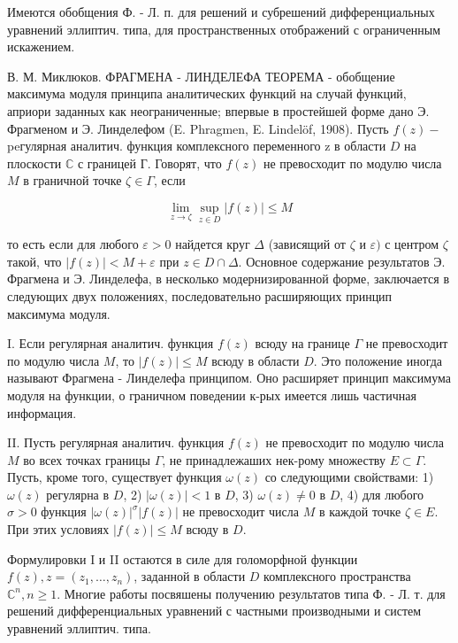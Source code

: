 \documentclass[10pt]{article}
\begin{document}
Имеются обобщения Ф. - Л. п. для решений и субрешений дифференциальных уравнений эллиптич. типа, для пространственных отображений с ограниченным искажением.



В. М. Миклюков. ФРАГМЕНА - ЛИНДЕЛЕФА ТЕОРЕМА - обобщение максимума модуля принципа аналитических функций на случай функций, априори заданных как неограниченные; впервые в простейшей форме дано Э. Фрагменом и Э. Линделефом (E. Phragmen, E. Lindelöf, 1908). Пусть $f(z)-$ peгулярная аналитич. функция комплексного переменного z в области $D$ на плоскости $\mathbb{C}$ с границей Г. Говорят, что $f(z)$ не превосходит по модулю числа $M$ в граничной точке $\zeta \in \Gamma$, если



\[

\lim _{z \rightarrow \zeta} \sup _{z \in D}|f(z)| \leqslant M

\]



то есть если для любого $\varepsilon>0$ найдется круг $\Delta$ (зависящий от $\zeta$ и $\varepsilon)$ с центром $\zeta$ такой, что $|f(z)|<M+\varepsilon$ при $z \in D \cap \Delta$. Основное содержание результатов Э. Фрагмена и Э. Линделефа, в несколько модернизированной форме, заключается в следующих двух положениях, последовательно расширяющих принцип максимума модуля.



I. Если регулярная аналитич. функция $f(z)$ всюду на границе $\Gamma$ не превосходит по модулю числа $M$, то $|f(z)| \leqslant M$ всюду в области $D$. Это положение иногда называют Фрагмена - Линделефа принципом. Оно расширяет принцип максимума модуля на функции, о граничном поведении к-рых имеется лишь частичная информация.



II. Пусть регулярная аналитич. функция $f(z)$ не превосходит по модулю числа $M$ во всех точках границы $\Gamma$, не принадлежаших нек-рому множеству $E \subset \Gamma$. Пусть, кроме того, существует функция $\omega(z)$ со следующими свойствами: 1) $\omega(z)$ регулярна в $D$, 2) $|\omega(z)|<1$ в $D$, 3) $\omega(z) \neq 0$ в $D$, 4) для любого $\sigma>0$ функция $|\omega(z)|^{\sigma}|f(z)|$ не превосходит числа $M$ в каждой точке $\zeta \in E$. При этих условиях $|f(z)| \leqslant M$ всюду в $D$.



Формулировки I и II остаются в силе для голоморфной функции $f(z), z=\left(z_{1}, \ldots, z_{n}\right)$, заданной в области $D$ комплексного пространства $\mathbb{C}^{n}, n \geqslant 1$. Многие работы посвяшены получению результатов типа Ф. - Л. т. для решений дифференциальных уравнений с частными производными и систем уравнений эллиптич. типа.
\end{document}
